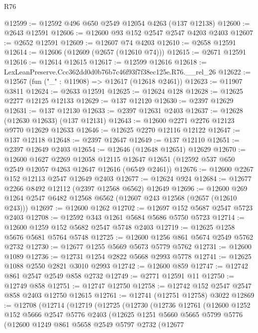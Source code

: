 \begin{lexlean}{R76}
\begin{coremodule}
@12599 := @12592 @496 @650 @2549 @12054 @4263 (@137 @12138)
@12600 := @2643 @12591
@12606 := @12600 @93 @152 @2547 @2547 @4203 @2403
@12607 := @2652 @12591
@12609 := @12607 @74 @4203
@12610 := @2658 @12591
@12614 := @12606 (@12609 (@2657 (@12610 @74)))
@12615 := @2671 @12591
@12616 := @12614 @12615
@12617 := @12599 @12616
@12618 := LexLeanPreserve.Ccc362dd0d0b76b7c46f93f7f38ec125e.R76.__rel_26
@12622 := @12567 (fun ("_" : @11908) => @12617 (@12618 @2461))
@12623 := @11907 @3811
@12624 := @2633 @12591
@12625 := @12624 @128
@12628 := @12625 @2277 @12125 @12133
@12629 := @137 @12120
@12630 := @2397 @12629
@12631 := @137 @12130
@12633 := @2397 @12631 @2403
@12637 := @12628 (@12630 @12633) (@137 @12131)
@12643 := @12600 @2271 @2276 @12123 @9770 @12629 @12633
@12646 := @12625 @2270 @12116 @12122
@12647 := @137 @12118
@12648 := @2397 @12647
@12649 := @137 @12110
@12651 := @2397 @12649 @2403
@12654 := @12646 (@12648 @12651) @12629
@12670 := @12600
    @1627
    @2269
    @12058
    @12115
    @12647
    @12651
    (@12592 @537 @650 @2549 @12057 @4263 @12647 @12616 (@6549 @2461))
@12676 := @12600 @2267 @152 @12113 @2547 @12649 @2403
@12677 := @12624 @924
@12684 := @12677 @2266 @8492 @12112 (@2397 @12568 @6562) @12649
@12696 := @12600 @269 @1264 @2547 @6482 @12568 @6562 (@12607 @243 @12568 (@2657 (@12610 @243)))
@12697 := @12600 @1262
@12702 := @12697 @152 @5687 @2547 @5723 @2403
@12708 := @12592 @343 @1261 @5684 @5686 @5750 @5723
@12714 := @12600 @1259 @152 @5682 @2547 @5748 @2403
@12719 := @12625 @1258 @5676 @5681 @5764 @5748
@12725 := @12600 @1256 @861 @5674 @2549 @5762 @2732
@12730 := @12677 @1255 @5669 @5673 @5779 @5762
@12731 := @12600 @1089
@12736 := @12731 @1254 @2822 @5668 @2993 @5778
@12741 := @12625 @1088 @2550 @2821 @3010 @2993
@12742 := @12600 @859
@12747 := @12742 @861 @2547 @2549 @858 @2732
@12749 := @2771 @12591 @11
@12750 := @12749 @858
@12751 := @12747 @12750
@12758 := @12742 @152 @2547 @2547 @858 @2403 @12750 @12615
@12761 := @12741 (@12751 @12758) @3022
@12869 := @12708
    (@12714
      (@12719
        (@12725
          (@12730
            (@12736
              @12761
              (@12600
                @1252
                @152
                @5666
                @2547
                @5776
                @2403
                (@12625
                  @1251
                  @5660
                  @5665
                  @5799
                  @5776
                  (@12600
                    @1249
                    @861
                    @5658
                    @2549
                    @5797
                    @2732
                    (@12677

\end{coremodule}
\end{lexlean}
